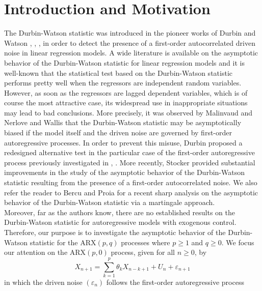 \documentclass[article,12pt]{amsart}
\numberwithin{equation}{section}
\theoremstyle{plain}
\begin{document}
\section{Introduction and Motivation}
\label{SectionIM}
\vspace{2ex}
The Durbin-Watson statistic was introduced in the pioneer works of Durbin and Watson \cite{DW1}, \cite{DW2}, \cite{DW3},
in order to detect the presence of a first-order autocorrelated driven noise in linear regression models.
A wide literature is available on the asymptotic behavior of the Durbin-Watson statistic for linear regression 
models and it is well-known that the statistical test based on the Durbin-Watson statistic performs pretty well
when the regressors are independent random variables. 
However, as soon as the regressors are lagged dependent variables, 
which is of course the most attractive case,
its widespread use in inappropriate situations may lead to bad conclusions. 
More precisely, it was observed by Malinvaud \cite{Malinvaud} and Nerlove and Wallis \cite{Nerlove} that
the Durbin-Watson statistic may be asymptotically biased if
the model itself and the driven noise are governed by first-order autoregressive processes. 
In order to prevent this misuse, Durbin \cite{Durbin} proposed a redesigned alternative test in the particular case 
of the first-order autoregressive process previously investigated in \cite{Malinvaud}, \cite{Nerlove}. 
More recently, Stocker \cite{Stocker} provided substantial improvements
in the study of the asymptotic behavior of the Durbin-Watson statistic
resulting from the presence of a first-order autocorrelated noise.
We also refer the reader to Bercu and Proia \cite{BPDW} for a recent sharp analysis on the
asymptotic behavior of the Durbin-Watson statistic via a martingale approach.
\ \vspace{1ex}\\
Moreover, far as the authors know, there are no established results on the Durbin-Watson statistic 
for autoregressive models with exogenous control. 
Therefore, our purpose is to investigate the asymptotic behavior of the Durbin-Watson statistic for the 
$\text{ARX}(p,q)$ processes where $p \geq 1$ and $q\geq 0$. 
We focus our attention on the $\text{ARX}(p,0)$ process, given for all $n\geq 0$, by
\begin{equation} 
\label{ARXP}
X_{n+1}=\sum_{k=1}^p\theta_k X_{n-k+1}+U_n+\varepsilon_{n+1}
\end{equation}
in which the driven noise $(\varepsilon_{n})$ follows the first-order autoregressive process
\end{document}
